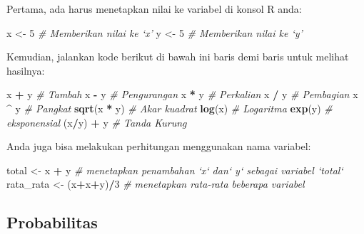 \documentclass[
]{book}
\newenvironment{Shaded}{\begin{snugshade}}{\end{snugshade}}
\newcommand{\CommentTok}[1]{\textcolor[rgb]{0.56,0.35,0.01}{\textit{#1}}}
\newcommand{\DecValTok}[1]{\textcolor[rgb]{0.00,0.00,0.81}{#1}}
\newcommand{\KeywordTok}[1]{\textcolor[rgb]{0.13,0.29,0.53}{\textbf{#1}}}
\newcommand{\NormalTok}[1]{#1}
\newcommand{\OperatorTok}[1]{\textcolor[rgb]{0.81,0.36,0.00}{\textbf{#1}}}
\newcommand{\StringTok}[1]{\textcolor[rgb]{0.31,0.60,0.02}{#1}}
\begin{document}
Pertama, ada harus menetapkan nilai ke variabel di konsol R anda:

\begin{Shaded}
\begin{Highlighting}[]
\NormalTok{x <-}\StringTok{ }\DecValTok{5} 	\CommentTok{# Memberikan nilai ke ‘x’}
\NormalTok{y <-}\StringTok{ }\DecValTok{5} 	\CommentTok{# Memberikan nilai ke ‘y’}
\end{Highlighting}
\end{Shaded}

Kemudian, jalankan kode berikut di bawah ini baris demi baris untuk melihat hasilnya:

\begin{Shaded}
\begin{Highlighting}[]
\NormalTok{x }\OperatorTok{+}\StringTok{ }\NormalTok{y 			            }\CommentTok{# Tambah}
\NormalTok{x }\OperatorTok{-}\StringTok{ }\NormalTok{y 			            }\CommentTok{# Pengurangan}
\NormalTok{x }\OperatorTok{*}\StringTok{ }\NormalTok{y 			            }\CommentTok{# Perkalian}
\NormalTok{x }\OperatorTok{/}\StringTok{ }\NormalTok{y 			            }\CommentTok{# Pembagian}
\NormalTok{x }\OperatorTok{^}\StringTok{ }\NormalTok{y 			            }\CommentTok{# Pangkat}
\KeywordTok{sqrt}\NormalTok{(x }\OperatorTok{*}\StringTok{ }\NormalTok{y)	            }\CommentTok{# Akar kuadrat}
\KeywordTok{log}\NormalTok{(x) 			            }\CommentTok{# Logaritma}
\KeywordTok{exp}\NormalTok{(y) 			            }\CommentTok{# eksponensial}
\NormalTok{(x}\OperatorTok{/}\NormalTok{y) }\OperatorTok{+}\StringTok{ }\NormalTok{y 		          }\CommentTok{# Tanda Kurung}
\end{Highlighting}
\end{Shaded}

Anda juga bisa melakukan perhitungan menggunakan nama variabel:

\begin{Shaded}
\begin{Highlighting}[]
\NormalTok{total <-}\StringTok{ }\NormalTok{x }\OperatorTok{+}\StringTok{ }\NormalTok{y 			    }\CommentTok{# menetapkan penambahan `x` dan` y` sebagai variabel `total`}
\NormalTok{rata_rata <-}\StringTok{ }\NormalTok{(x}\OperatorTok{+}\NormalTok{x}\OperatorTok{+}\NormalTok{y)}\OperatorTok{/}\DecValTok{3} 	\CommentTok{# menetapkan rata-rata beberapa variabel}
\end{Highlighting}
\end{Shaded}

\hypertarget{probabilitas}{%
\subsection{Probabilitas}\label{probabilitas}}
\end{document}
